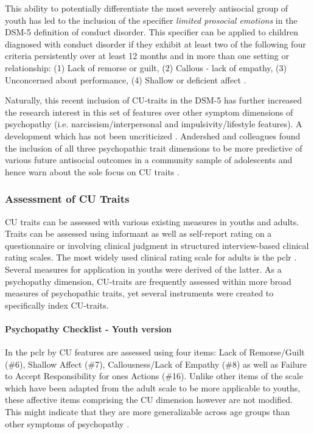 This ability to potentially differentiate the most severely antisocial group of youth has led to the inclusion of the specifier \textit{limited prosocial emotions} in the DSM-5 \parencite{DSM-5} definition of conduct disorder.
This specifier can be applied to children diagnosed with conduct disorder if they exhibit at least two of the following four criteria persistently over at least 12 months and in more than one setting or relationship:
(1) Lack of remorse or guilt,
(2) Callous - lack of empathy,
(3) Unconcerned about performance,
(4) Shallow or deficient affect \parencite{DSM-5}.

Naturally, this recent inclusion of CU-traits in the DSM-5 has further increased the research interest in this set of features over other symptom dimensions of psychopathy (i.e. narcissism/interpersonal and impulsivity/lifestyle features). 
A development which has not been uncriticized \parencite{lahey_what_2014}.
Andershed and colleagues found the inclusion of all three psychopathic trait dimensions to be more predictive of various future antisocial outcomes in a community sample of adolescents and hence warn about the sole focus on CU traits \parencite*{andershed_callous-unemotional_2018}.

\subsubsection{Assessment of CU Traits}
CU traits can be assessed with various existing measures in youths and adults.
Traits can be assessed using informant as well as self-report rating on a questionnaire
or involving clinical judgment in structured interview-based clinical rating scales.
The most widely used clinical rating scale for adults is the \gls{pclr}
\parencite{hare_pcl-r_2018}.
Several measures for application in youths were derived of the latter.
As a psychopathy dimension, CU-traits are frequently assessed within more broad measures of psychopathic traits,
yet several instruments were created to specifically index CU-traits.

\paragraph{Psychopathy Checklist - Youth version}

In the \gls{pclr} by \textcites{forth_psychopathy_1990}
CU features are assessed using four items: Lack of Remorse/Guilt (\#6),
Shallow Affect (\#7), Callousness/Lack of Empathy (\#8) as well as Failure to Accept Responsibility for ones Actions (\#16).
Unlike other items of the scale which have been adapted from the adult scale to be more applicable to youths,
these affective items comprising the CU dimension however are not modified. 
This might indicate that they are more generalizable across age groups than other symptoms of psychopathy \parencite{viding_callousunemotional_2018}.

